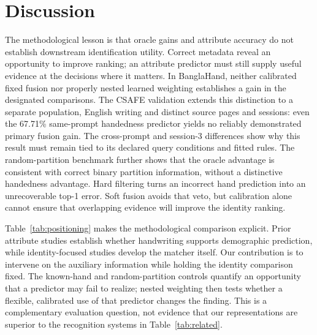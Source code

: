 \documentclass[ASNA,twocolumn]{USG}
\begin{document}
\section{Discussion}
The methodological lesson is that oracle gains and attribute accuracy do not establish downstream identification utility. Correct metadata reveal an opportunity to improve ranking; an attribute predictor must still supply useful evidence at the decisions where it matters. In BanglaHand, neither calibrated fixed fusion nor properly nested learned weighting establishes a gain in the designated comparisons. The CSAFE validation extends this distinction to a separate population, English writing and distinct source pages and sessions: even the 67.71\% same-prompt handedness predictor yields no reliably demonstrated primary fusion gain. The cross-prompt and session-3 differences show why this result must remain tied to its declared query conditions and fitted rules. The random-partition benchmark further shows that the oracle advantage is consistent with correct binary partition information, without a distinctive handedness advantage. Hard filtering turns an incorrect hand prediction into an unrecoverable top-1 error. Soft fusion avoids that veto, but calibration alone cannot ensure that overlapping evidence will improve the identity ranking.

Table~\ref{tab:positioning} makes the methodological comparison explicit. Prior attribute studies establish whether handwriting supports demographic prediction, while identity-focused studies develop the matcher itself. Our contribution is to intervene on the auxiliary information while holding the identity comparison fixed. The known-hand and random-partition controls quantify an opportunity that a predictor may fail to realize; nested weighting then tests whether a flexible, calibrated use of that predictor changes the finding. This is a complementary evaluation question, not evidence that our representations are superior to the recognition systems in Table~\ref{tab:related}.
\end{document}
